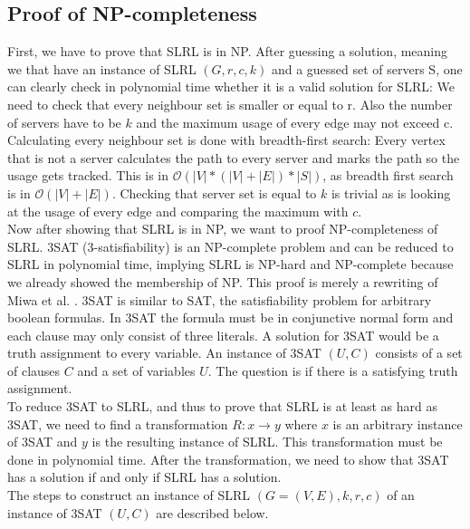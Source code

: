 \documentclass [12pt]{article}
\begin{document}
\subsection{Proof of NP-completeness}
First, we have to prove that SLRL is in NP. After guessing a solution, meaning we that
have an instance of SLRL $(G,r,c,k)$ and a guessed set of servers S, one can clearly check 
in polynomial time whether it is a valid solution for SLRL: We need to check that every neighbour set is smaller
or equal to r. Also the number of servers have to be $k$ and the maximum usage of every edge may not exceed c.
Calculating every neighbour set is done with breadth-first search: Every vertex that is not a server calculates
the path to every server and marks the path so the usage gets tracked. This is in $\mathcal{O}(|V|*(|V|+|E|)*|S|)$, as breadth first
search is in $\mathcal{O}(|V|+|E|)$. Checking that server set is equal to $k$ is trivial as is looking at the usage of
every edge and comparing the maximum with $c$.\\
Now after showing that SLRL is in NP, we want to proof NP-completeness of SLRL.
3SAT (3-satisfiability) is an NP-complete problem \cite{Garey:1979:CIG:578533} and can be reduced to SLRL in polynomial time,
implying SLRL is NP-hard and NP-complete because we already showed the membership of NP. 
This proof is merely a rewriting of Miwa et al. \cite{mirrorserver}.
3SAT is similar to SAT, the satisfiability problem for arbitrary boolean formulas. In 3SAT the formula must be in conjunctive normal form and 
each clause may only consist of three literals. A solution for 3SAT would be a truth assignment to every
variable. An instance of 3SAT $(U,C)$ consists of a set of clauses $C$ and a set of variables $U$. The question is if there is a satisfying
truth assignment.\\
To reduce 3SAT to SLRL, and thus to prove that SLRL is at least as hard as 3SAT, we need to find a 
transformation $R: x \rightarrow y$ where $x$ is an arbitrary instance of 3SAT and $y$ is the resulting instance of SLRL. This transformation must be 
done in polynomial time. After the transformation, we need to show that 3SAT has a solution if and only if 
SLRL has a solution.\\
The steps to construct an instance of SLRL $(G=(V,E),k,r,c)$ of an instance of 3SAT $(U,C)$ are described below.
\end{document}
